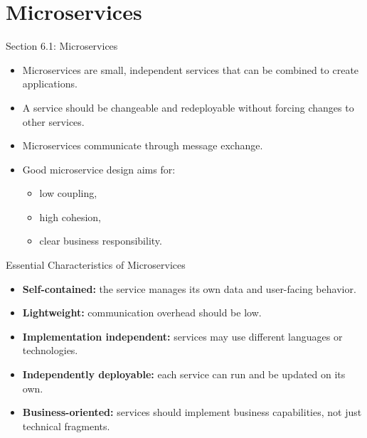 \section{Microservices}

\begin{frame}{Section 6.1: Microservices}
\begin{itemize}
    \item Microservices are small, independent services that can be combined to create applications.
    \item A service should be changeable and redeployable without forcing changes to other services.
    \item Microservices communicate through message exchange.
    \item Good microservice design aims for:
    \begin{itemize}
        \item low coupling,
        \item high cohesion,
        \item clear business responsibility.
    \end{itemize}
\end{itemize}
\end{frame}

\begin{frame}{Essential Characteristics of Microservices}
\begin{itemize}
    \item \textbf{Self-contained:} the service manages its own data and user-facing behavior.
    \item \textbf{Lightweight:} communication overhead should be low.
    \item \textbf{Implementation independent:} services may use different languages or technologies.
    \item \textbf{Independently deployable:} each service can run and be updated on its own.
    \item \textbf{Business-oriented:} services should implement business capabilities, not just technical fragments.
\end{itemize}
\end{frame}

